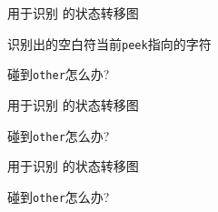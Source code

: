 \begin{frame}{}
  \begin{center}
    用于识别 \blue{\ws} 的状态转移图

    \pause
    \vspace{0.60cm}
    \red{$\ast$:} 识别出的空白符当前\texttt{peek}指向的字符

    \pause
    \vspace{0.40cm}
     碰到\texttt{other}怎么办?
  \end{center}
\end{frame}

\begin{frame}{}
  \begin{center}
    用于识别 \blue{\id} 的状态转移图

    \vspace{0.60cm}

    \pause
    \vspace{0.40cm}
     碰到\texttt{other}怎么办?
  \end{center}
\end{frame}

\begin{frame}{}
  \begin{center}
    用于识别 \blue{\intnum} 的状态转移图

    \pause
    \vspace{0.40cm}
     碰到\texttt{other}怎么办?
  \end{center}
\end{frame}

